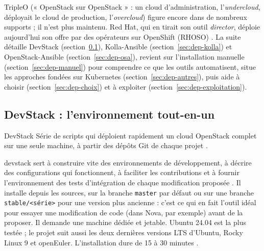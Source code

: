 TripleO (« OpenStack sur OpenStack » : un cloud d'administration, l'\emph{undercloud}, déployait le cloud de production,
l'\emph{overcloud}) figure encore dans de nombreux supports ; il n'est plus maintenu. Red Hat, qui en tirait son outil
\emph{director}, déploie aujourd'hui son offre par des opérateurs sur OpenShift (RHOSO) \parencite{tripleo-docs,rhoso-deploy}. La suite
détaille DevStack (section~\ref{sec:dep-devstack}), Kolla-Ansible (section~\ref{sec:dep-kolla}) et OpenStack-Ansible
(section~\ref{sec:dep-osa}), revient sur l'installation manuelle (section~\ref{sec:dep-manuel}) pour comprendre ce que les outils
automatisent, situe les approches fondées sur Kubernetes (section~\ref{sec:dep-autres}), puis aide à choisir
(section~\ref{sec:dep-choix}) et à exploiter (section~\ref{sec:dep-exploitation}).

\subsection{DevStack : l'environnement tout-en-un}\label{sec:dep-devstack}

\begin{definition}{DevStack}
Série de scripts qui déploient rapidement un cloud OpenStack complet sur une seule machine, à partir des dépôts Git de chaque projet
\parencite{devstack-index}.
\end{definition}

\gls{devstack} sert à construire vite des environnements de développement, à décrire des configurations qui fonctionnent, à faciliter les
contributions et à fournir l'environnement des tests d'intégration de chaque modification proposée \parencite{devstack-source}. Il
installe depuis les sources, sur la branche \texttt{master} par défaut ou sur une branche \texttt{stable/<série>} pour une version plus
ancienne : c'est ce qui en fait l'outil idéal pour essayer une modification de code (dans Nova, par exemple) avant de la proposer. Il
demande une machine dédiée et jetable. Ubuntu 24.04 est la plus testée ; le projet suit aussi les deux dernières versions LTS
d'Ubuntu, Rocky Linux 9 et openEuler. L'installation dure de 15 à 30 minutes \parencite{devstack-index}.

